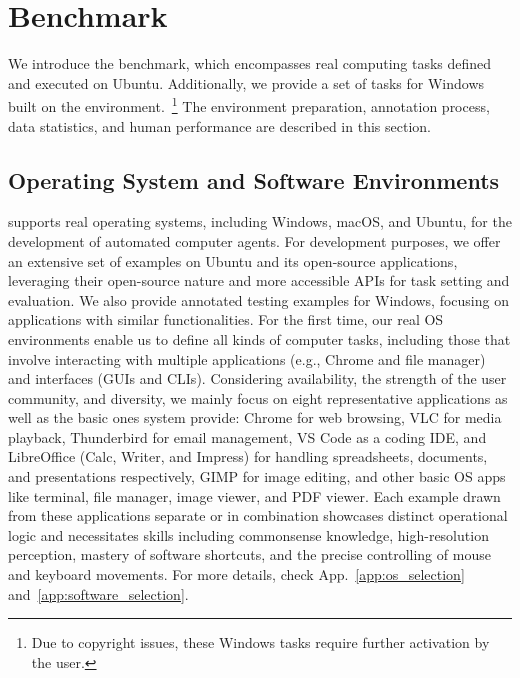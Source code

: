 \vspace{-5pt}
\section{\ours Benchmark}\label{sec:method}
\vspace{-5pt}

We introduce the \ours benchmark, which encompasses \numexamples real computing tasks defined and executed on Ubuntu. 
Additionally, we provide a set of \numexampleswindows tasks for Windows built on the \ours environment.~\footnote{Due to copyright issues, these Windows tasks require further activation by the user.}
The environment preparation, annotation process, data statistics, and human performance are described in this section.


\vspace{-5pt}
\subsection{Operating System and Software Environments}

\ours supports real operating systems, including Windows, macOS, and Ubuntu, for the development of automated computer agents. 
For development purposes, we offer an extensive set of examples on Ubuntu and its open-source applications, leveraging their open-source nature and more accessible APIs for task setting and evaluation. 
We also provide annotated testing examples for Windows, focusing on applications with similar functionalities.
For the first time, our real OS environments enable us to define all kinds of computer tasks, including those that involve interacting with multiple applications (e.g., Chrome and file manager) and interfaces (GUIs and CLIs).
Considering availability, the strength of the user community, and diversity, we mainly focus on eight representative applications as well as the basic ones system provide: 
Chrome for web browsing, VLC for media playback, Thunderbird for email management, VS Code as a coding IDE, and LibreOffice (Calc, Writer, and Impress) for handling spreadsheets, documents, and presentations respectively, GIMP for image editing, and other basic OS apps like terminal, file manager, image viewer, and PDF viewer.
Each example drawn from these applications separate or in combination showcases distinct operational logic and necessitates skills including commonsense knowledge, high-resolution perception, mastery of software shortcuts, and the precise controlling of mouse and keyboard movements.
For more details, check App.~\ref{app:os_selection} and~\ref{app:software_selection}.


